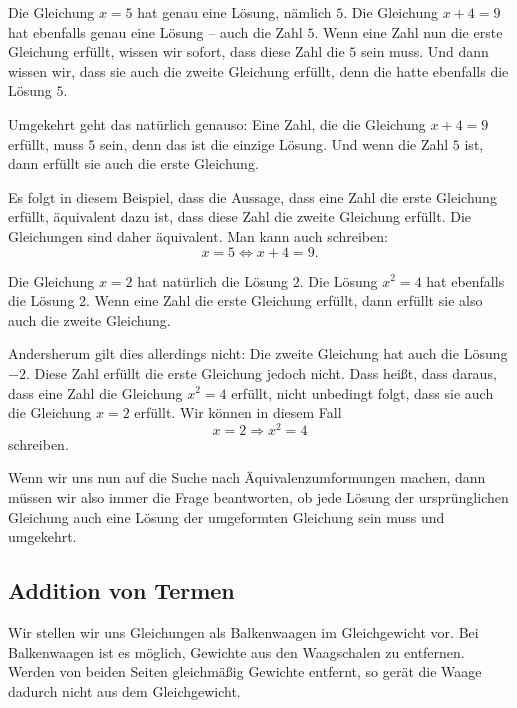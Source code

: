 \documentclass[../../main.tex]{subfiles}
\begin{document}
\begin{example}
    Die Gleichung $x=5$ hat genau eine Lösung, nämlich $5$. Die Gleichung $x+4=9$ hat ebenfalls genau eine Lösung -- auch die Zahl $5$. Wenn eine Zahl nun die erste Gleichung erfüllt, wissen wir sofort, dass diese Zahl die $5$ sein muss. Und dann wissen wir, dass sie auch die zweite Gleichung erfüllt, denn die hatte ebenfalls die Lösung $5$.
    
    Umgekehrt geht das natürlich genauso: Eine Zahl, die die Gleichung $x+4=9$ erfüllt, muss $5$ sein, denn das ist die einzige Lösung. Und wenn die Zahl $5$ ist, dann erfüllt sie auch die erste Gleichung.
    
    Es folgt in diesem Beispiel, dass die Aussage, dass eine Zahl die erste Gleichung erfüllt, äquivalent dazu ist, dass diese Zahl die zweite Gleichung erfüllt. Die Gleichungen sind daher äquivalent. Man kann auch schreiben:
    \[x=5\Leftrightarrow x+4=9.\]
\end{example}
\begin{example}
    \label{ex:sqrt_umformung}
    Die Gleichung $x=2$ hat natürlich die Lösung $2$. Die Lösung $x^2=4$ hat ebenfalls die Lösung $2$. Wenn eine Zahl die erste Gleichung erfüllt, dann erfüllt sie also auch die zweite Gleichung.
    
    Andersherum gilt dies allerdings nicht: Die zweite Gleichung hat auch die Lösung $-2$. Diese Zahl erfüllt die erste Gleichung jedoch nicht. Dass heißt, dass daraus, dass eine Zahl die Gleichung $x^2=4$ erfüllt, nicht unbedingt folgt, dass sie auch die Gleichung $x=2$ erfüllt. Wir können in diesem Fall
    \[x=2\Rightarrow x^2=4\]
    schreiben.
\end{example}
Wenn wir uns nun auf die Suche nach Äquivalenzumformungen machen, dann müssen wir also immer die Frage beantworten, ob jede Lösung der ursprünglichen Gleichung auch eine Lösung der umgeformten Gleichung sein muss und umgekehrt.

\subsection{Addition von Termen}

Wir stellen wir uns Gleichungen als Balkenwaagen im Gleichgewicht vor. Bei Balkenwaagen ist es möglich, Gewichte aus den Waagschalen zu entfernen. Werden von beiden Seiten gleichmäßig Gewichte entfernt, so gerät die Waage dadurch nicht aus dem Gleichgewicht.
\end{document}
